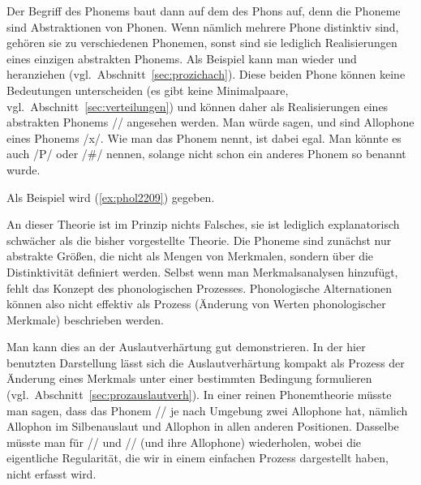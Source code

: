 
Der Begriff des Phonems baut dann auf dem des Phons auf, denn die Phoneme sind Abstraktionen von Phonen.
Wenn nämlich mehrere Phone distinktiv sind, gehören sie zu verschiedenen Phonemen, sonst sind sie lediglich Realisierungen eines einzigen abstrakten Phonems.
Als Beispiel kann man wieder \textipa{[\c{c}]} und \textipa{[X]} heranziehen (vgl.\ Abschnitt~\ref{sec:prozichach}).
Diese beiden Phone können keine Bedeutungen unterscheiden (es gibt keine Minimalpaare, vgl.\ Abschnitt~\ref{sec:verteilungen}) und können daher als Realisierungen eines abstrakten Phonems // angesehen werden.
Man würde sagen, \textipa{[\c{c}]} und \textipa{[X]} sind Allophone eines Phonems /x/.
Wie man das Phonem nennt, ist dabei egal.
Man könnte es auch /P/ oder /\#/ nennen, solange nicht schon ein anderes Phonem so benannt wurde.


Als Beispiel wird (\ref{ex:phol2209}) gegeben.

\begin{exe}
  \ex\label{ex:phol2209}
  \begin{xlist}
  \end{xlist}
\end{exe}

An dieser Theorie ist im Prinzip nichts Falsches, sie ist lediglich explanatorisch schwächer als die bisher vorgestellte Theorie.
Die Phoneme sind zunächst nur abstrakte Größen, die nicht als Mengen von Merkmalen, sondern über die Distinktivität definiert werden.
Selbst wenn man Merkmalsanalysen hinzufügt, fehlt das Konzept des phonologischen Prozesses.
Phonologische Alternationen können also nicht effektiv als Prozess (Änderung von Werten phonologischer Merkmale) beschrieben werden.

Man kann dies an der Auslautverhärtung gut demonstrieren.
In der hier benutzten Darstellung lässt sich die Auslautverhärtung kompakt als Prozess der Änderung eines Merkmals unter einer bestimmten Bedingung formulieren (vgl.\ Abschnitt~\ref{sec:prozauslautverh}).
In einer reinen Phonemtheorie müsste man sagen, dass das Phonem // je nach Umgebung zwei Allophone hat, nämlich Allophon \textipa{[p]} im Silbenauslaut und Allophon \textipa{[b]} in allen anderen Positionen.
Dasselbe müsste man für // und // (und ihre Allophone) wiederholen, wobei die eigentliche Regularität, die wir in einem einfachen Prozess dargestellt haben, nicht erfasst wird.

